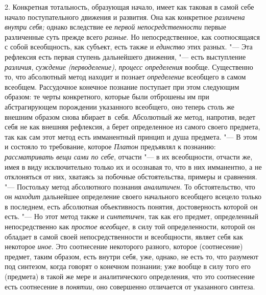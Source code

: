 2. Конкретная тотальность, образующая начало, имеет как
таковая в самой себе начало поступательного движения и развития. Она как
конкретное {\em различена внутри себя;}
однако вследствие ее {\em первой непосредственности}
первые различенные суть прежде всего {\em разные}. Но
непосредственное, как соотносящаяся с собой всеобщность, как субъект, есть
также и {\em единство} этих разных. "--- Эта рефлексия есть первая
ступень дальнейшего движения, "--- есть выступление
{\em различия}, {\em суждение (перводеление)}, {\em процесс определения}
вообще. Существенно то, что абсолютный метод находит и
познает {\em определение}
всеобщего в самом всеобщем. Рассудочное конечное познание
поступает при этом следующим образом: те черты конкретного, которые были
отброшены им при абстрагирующем порождении указанного всеобщего, оно теперь
столь же внешним образом снова вбирает в~себя. Абсолютный же метод,
напротив, ведет себя не как внешняя рефлексия, а берет определенное из
самого своего предмета, так как сам этот метод есть имманентный принцип и
душа предмета. "--- В этом и состояло то
требование, которое {\em Платон}
предъявлял к познанию:
{\em рассматривать вещи сами по себе},
отчасти "--- в их всеобщности, отчасти же, имея в
виду исключительно только их и осознавая то, что в них имманентно, а не
отклоняться от них, хватаясь за побочные обстоятельства, примеры и
сравнения. "--- Постольку метод абсолютного познания
{\em аналитичен}. То
обстоятельство, что он {\em находит}
дальнейшее определение своего начального всеобщего всецело
только в последнем, есть абсолютная объективность понятия, достоверность
которой он есть. "--- \label{bkm:bmpg224a}Но этот метод также и
{\em синтетичен}, так как
его предмет, определенный непосредственно как {\em простое всеобщее}, в
силу той определенности, которой он обладает в самой своей
непосредственности и всеобщности, являет себя как некоторое
{\em иное}. Это
соотнесение некоторого разного, которое (соотнесение) предмет, таким
образом, есть внутри себя, уже, однако, не есть то, что разумеют под
синтезом, когда говорят о конечном познании; уже вообще в силу того его
(предмета) в такой же мере и аналитического определения, что это
соотнесение есть соотнесение в {\em понятии}, оно
совершенно отличается от указанного синтеза.

